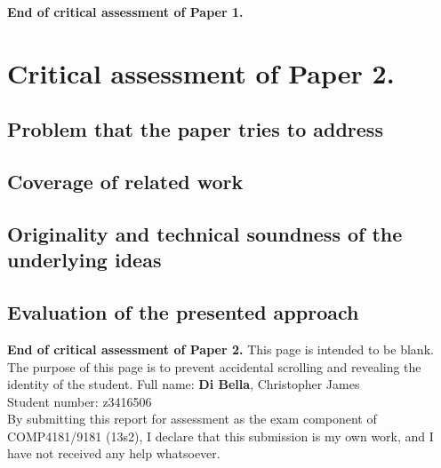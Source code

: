 \documentclass[9pt]{report}
\begin{document}
\vspace{25mm}
\noindent
{\bf End of critical assessment of Paper 1.}
\clearpage
\section*{Critical assessment of Paper 2.}
\subsection*{Problem that the paper tries to address}
\subsection*{Coverage of related work}
\subsection*{Originality and technical soundness of the underlying ideas}
\subsection*{Evaluation of the presented approach}

\noindent
{\bf End of critical assessment of Paper 2.}
\clearpage
\noindent
This page is intended to be blank.\\

\noindent
The purpose of this page is to prevent accidental scrolling and revealing the identity of the student.
\clearpage
\noindent
Full name: \hspace{8mm} {\bf Di Bella}, Christopher James\\
Student number: z3416506\\

\noindent
By submitting this report for assessment as the exam component of COMP4181/9181 (13s2), I declare that this submission is my own work, and I have not received any help whatsoever.
\end{document}
